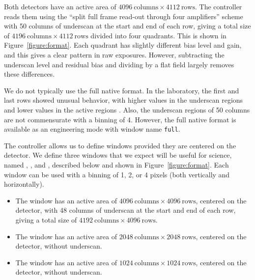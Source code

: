 Both detectors have an active area of $4096~\mbox{columns} \times 4112~\mbox{rows}$. The controller reads them using the “split full frame read-out through four amplifiers” scheme \citep[p.~17]{e2v} with 50 columns of underscan at the start and end of each row, giving a total size of $4196~\mbox{columns} \times 4112~\mbox{rows}$ divided into four quadrants. This is shown in Figure~\ref{figure:format}. Each quadrant has slightly different bias level and gain, and this gives a clear pattern in raw exposures. However, subtracting the underscan level and residual bias and dividing by a flat field largely removes these differences.

We do not typically use the full native format. In the laboratory, the first and last rows showed unusual behavior, with higher values in the underscan regions and lower values in the active regions \citep{laboratory}. Also, the underscan regions of 50 columns are not commensurate with a binning of 4.  However, the full native format is available as an engineering mode with window name \verb|full|.

The controller allows us to define windows provided they are centered on the detector. We define three windows that we expect will be useful for science, named , , and , described below and shown in Figure~\ref{figure:format}. Each window can be used with a binning of 1, 2, or 4 pixels (both vertically and horizontally).

\begin{itemize}
\item 
The  window has an active area of $4096~\mbox{columns} \times 4096~\mbox{rows}$, centered on the detector, with 48 columns of underscan at the start and end of each row, giving a total size of $4192~\mbox{columns} \times 4096~\mbox{rows}$.
\item
The  window has an active area of $2048~\mbox{columns} \times 2048~\mbox{rows}$, centered on the detector, without underscan.
\item
The  window has an active area of $1024~\mbox{columns} \times 1024~\mbox{rows}$, centered on the detector, without underscan.
\end{itemize}

